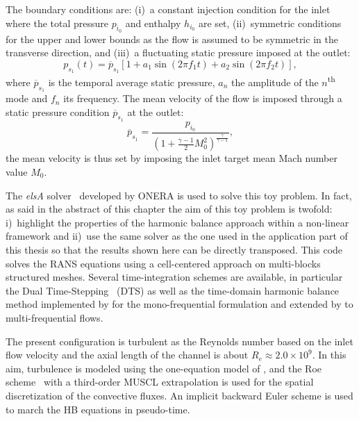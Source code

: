 The boundary conditions are: (i)~a constant injection condition for the inlet
where the total pressure $p_{i_0}$ and enthalpy $h_{i_0}$ are set,
(ii)~symmetric conditions for the upper and lower bounds as the flow
is assumed to be symmetric in the transverse direction, and (iii)~a
fluctuating static pressure imposed at the outlet:
\begin{equation}
  p_{s_1}(t) = \overline{p}_{s_1} \left[1 + a_1 \sin(2 \pi f_1 t) +
    a_2 \sin(2 \pi f_2 t) \right],
  \label{eq:outlet_canal}
\end{equation}
where $\overline{p}_{s_1}$ is the temporal average static pressure, $a_n$ the
amplitude of the $n$\textsuperscript{th} mode and $f_n$ its
frequency.
The mean velocity of the flow is imposed through a
static pressure condition $\overline{p}_{s_1}$ at the outlet:
\begin{equation}
    \overline{p}_{s_1} = \frac{p_{i_0}}{\left(1 + 
    \frac{\gamma - 1}{2} M_{0}^2 \right) ^ {\frac{\gamma}{ \gamma - 1}}} ,
\end{equation}
the mean velocity is thus set by imposing the
inlet target mean Mach number value $M_{0}$.

The \emph{elsA} solver~\cite{Cambier2013} developed by ONERA
is used to solve this toy problem. In fact, as said in the
abstract of this chapter the aim of this toy problem is 
twofold: i)~highlight the properties of the harmonic balance
approach within a non-linear framework and ii)~use the same
solver as the one used in the application part of this
thesis so that the results shown here can be directly
transposed. 
This code solves the RANS equations using a cell-centered
approach on multi-blocks structured meshes.
Several time-integration schemes
are available, in particular the Dual Time-Stepping~\cite{Jameson1981} (DTS)
as well as the time-domain harmonic 
balance method implemented by \citet{JSicot2008} for the mono-frequential
formulation and extended by \citet{JGuedeney2013} to multi-frequential flows. 


The present configuration is turbulent as the Reynolds number based on the
inlet flow velocity and the axial length of the channel is about $R_e
\approx 2.0 \times 10^9$. In this aim, turbulence is modeled using the
one-equation model of \citet{Spalart1992}, and the
Roe scheme~\cite{Roe1981} with a third-order MUSCL extrapolation 
is used for the spatial discretization of
the convective fluxes. An implicit backward Euler scheme is used
to march the HB equations in pseudo-time.


